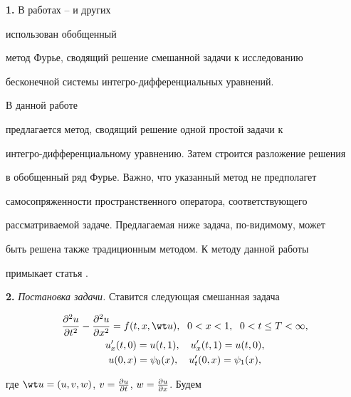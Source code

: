  




\maketitle 


\label{begin} 


 


{\bf 1.} В работах \cite{1}--\cite{6} и других 


использован обобщенный 


метод Фурье, сводящий решение смешанной задачи к исследованию 


бесконечной системы интегро-диф\-фе\-рен\-ци\-аль\-ных уравнений.


В данной работе 


предлагается метод, сводящий решение одной простой задачи к 


интегро-дифференциальному уравнению. Затем строится разложение решения 


в обобщенный ряд Фурье. Важно, что указанный метод не предполагет 


самосопряженности пространственного оператора, соответствующего 


рассматриваемой задаче. Предлагаемая ниже задача, по-видимому, может 


быть решена также традиционным методом. К методу данной работы 


примыкает статья \cite{7}. 


\medskip 


 


{\bf 2.} {\it Постановка задачи.} Ставится следующая смешанная задача 


\begin{gather} 


\myfrac{^2u}{t^2}-\myfrac{^2u}{x^2}=f(t,x,\wt u),\ \;0<x<1, 


\ \; 0<t\le T<\infty,\\ 


u'_x(t,0)=u(t,1),\quad u'_x(t,1)=u(t,0),\\ 


u(0,x)=\psi_0(x),\quad u'_t(0,x)=\psi_1(x), 


\end{gather} 


где $\wt u=(u,v,w)$, $v=\frac{\partial u}{\partial t}$, $w=\frac{\partial u}{\partial x}$. Будем 


